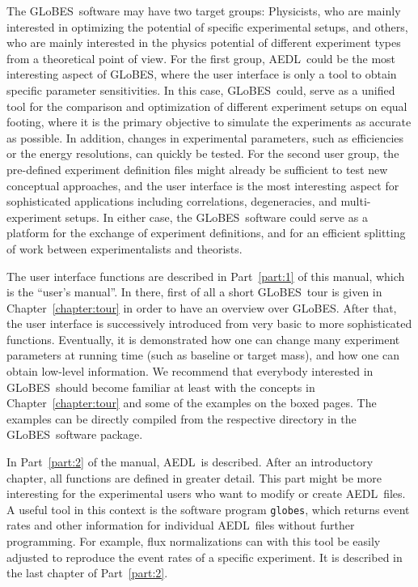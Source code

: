 \documentclass[a4paper,12pt,twoside]{book}
\newcommand{\Chapt}{Chapter}
\newcommand{\Part}{Part}
\newcommand{\GLOBES}{{\sf GLoBES}}
\newcommand{\AEDL}{{\sf AEDL}}
\begin{document}
The \GLOBES\ software may have two target groups: 
Physicists, who are mainly interested in optimizing the potential
of specific experimental setups, and others, who are mainly
interested in the physics potential of different experiment types
from a theoretical point of view.
For the first group, \AEDL\ could be the most interesting aspect of
\GLOBES , where the user interface is only a tool to obtain specific
parameter sensitivities. In this case, \GLOBES\ could, serve as a
unified tool for the comparison and optimization of different experiment
 setups on equal footing, where
it is the primary objective to simulate the experiments as accurate
as possible. In addition, changes in experimental parameters, such as
efficiencies or the energy resolutions, can quickly be tested.
%
For the second user group, the pre-defined 
experiment definition files might already be sufficient to test
new conceptual approaches, and the user interface is the most interesting
aspect for sophisticated applications including correlations,
degeneracies, and multi-experiment setups. In either case, the \GLOBES\
software could serve as a platform for the exchange of experiment
definitions, and for an efficient splitting of work between
experimentalists and theorists.

The user interface functions are described in \Part~\ref{part:1} of 
this manual, which is the ``user's manual''. In there, first of all a 
short \GLOBES\ tour is given in \Chapt~\ref{chapter:tour} in order to 
have an overview over \GLOBES . 
After that, the user
interface is successively introduced from very basic to more sophisticated
functions. Eventually, it is demonstrated how one can change many
experiment parameters at running time (such as baseline or target mass), and how one can obtain low-level
information. We recommend that everybody interested in \GLOBES\ should
become familiar at least with the concepts in \Chapt~\ref{chapter:tour}
 and some of the examples on the boxed pages. The examples can be 
 directly compiled 
 from the respective directory in the \GLOBES\ software package.

In \Part~\ref{part:2} of the manual, \AEDL\ is described. After an
introductory chapter, all functions are defined in greater detail.
This part might be more interesting for the experimental users who
want to modify or create \AEDL\ files. A useful tool in this context
is the software program \verb+globes+, which returns event rates and other
information for individual \AEDL\ files without further programming. 
For example, flux normalizations can with this tool be easily adjusted 
to reproduce the event rates of a specific experiment. It is described
in the last chapter of \Part~\ref{part:2}.
\end{document}
